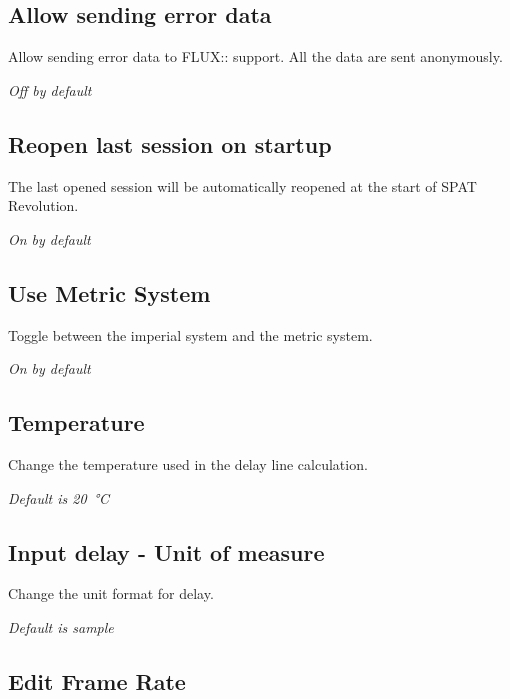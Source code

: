 \documentclass[
  letterpaper,
  DIV=11,
  numbers=noendperiod]{scrreport}
\begin{document}
\hypertarget{allow-sending-error-data}{%
\subsection{Allow sending error data}\label{allow-sending-error-data}}

Allow sending error data to FLUX:: support. All the data are sent
anonymously.

\emph{Off by default}

\hypertarget{reopen-last-session-on-startup}{%
\subsection{Reopen last session on
startup}\label{reopen-last-session-on-startup}}

The last opened session will be automatically reopened at the start of
SPAT Revolution.

\emph{On by default}

\hypertarget{use-metric-system}{%
\subsection{Use Metric System}\label{use-metric-system}}

Toggle between the imperial system and the metric system.

\emph{On by default}

\hypertarget{temperature}{%
\subsection{Temperature}\label{temperature}}

Change the temperature used in the delay line calculation.

\emph{Default is 20~°C}

\hypertarget{input-delay---unit-of-measure}{%
\subsection{Input delay - Unit of
measure}\label{input-delay---unit-of-measure}}

Change the unit format for delay.

\emph{Default is sample}

\hypertarget{edit-frame-rate}{%
\subsection{Edit Frame Rate}\label{edit-frame-rate}}
\end{document}
